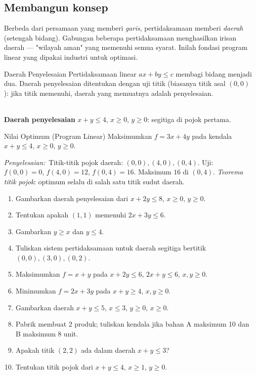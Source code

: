 \documentclass[11pt,a4paper]{report}
\theoremstyle{gaya}
\newcommand{\jawab}{\par\smallskip\noindent\textit{\textcolor{oranye}{Penyelesaian:}}\ }
\begin{document}
\subsection*{Membangun konsep}
Berbeda dari persamaan yang memberi \emph{garis}, pertidaksamaan memberi \emph{daerah} (setengah bidang). Gabungan beberapa pertidaksamaan menghasilkan irisan daerah --- "wilayah aman" yang memenuhi semua syarat. Inilah fondasi program linear yang dipakai industri untuk optimasi.

\begin{konsep}{Daerah Penyelesaian}
Pertidaksamaan linear $ax+by \le c$ membagi bidang menjadi dua. Daerah penyelesaian ditentukan dengan uji titik (biasanya titik asal $(0,0)$): jika titik memenuhi, daerah yang memuatnya adalah penyelesaian.
\end{konsep}

\begin{center}
\\
\small \textbf{Daerah penyelesaian} $x+y\le4$, $x\ge0$, $y\ge0$: segitiga di pojok pertama.
\end{center}

\begin{contoh}{Nilai Optimum (Program Linear)}
Maksimumkan $f=3x+4y$ pada kendala $x+y\le 4$, $x\ge0$, $y\ge0$.

\jawab Titik-titik pojok daerah: $(0,0),(4,0),(0,4)$. Uji: $f(0,0)=0$, $f(4,0)=12$, $f(0,4)=16$. Maksimum $16$ di $(0,4)$. \emph{Teorema titik pojok}: optimum selalu di salah satu titik sudut daerah.
\end{contoh}

\begin{latihan}
\begin{enumerate}[leftmargin=*]
  \item Gambarkan daerah penyelesaian dari $x+2y\le 8$, $x\ge0$, $y\ge0$.
  \item Tentukan apakah $(1,1)$ memenuhi $2x+3y\le 6$.
  \item Gambarkan $y\ge x$ dan $y\le 4$.
  \item Tuliskan sistem pertidaksamaan untuk daerah segitiga bertitik $(0,0),(3,0),(0,2)$.
  \item Maksimumkan $f=x+y$ pada $x+2y\le6$, $2x+y\le6$, $x,y\ge0$.
  \item Minimumkan $f=2x+3y$ pada $x+y\ge4$, $x,y\ge0$.
  \item Gambarkan daerah $x+y\le5$, $x\le3$, $y\ge0$, $x\ge0$.
  \item Pabrik membuat 2 produk; tuliskan kendala jika bahan A maksimum 10 dan B maksimum 8 unit.
  \item Apakah titik $(2,2)$ ada dalam daerah $x+y\le3$?
  \item Tentukan titik pojok dari $x+y\le4$, $x\ge1$, $y\ge0$.
\end{enumerate}
\end{latihan}
\end{document}
